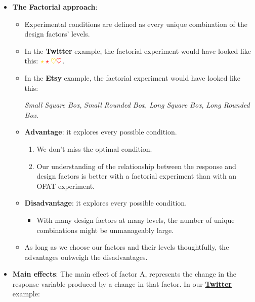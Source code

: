 \begin{itemize}
      \item \textbf{The Factorial approach}:
            \begin{itemize}
                  \item Experimental conditions are defined as every unique combination of the design factors' levels.
                  \item In the \textbf{Twitter} example, the factorial experiment would have looked like this:
                        $ \color{Gold}\star\color{Red}\star\color{Gold}\heartsuit\color{Red}\heartsuit $.
                  \item In the \textbf{Etsy} example, the factorial experiment would have looked like this:
                        \begin{tightcenter}
                              \emph{Small Square Box}, \emph{Small Rounded Box}, \emph{Long Square Box}, \emph{Long Rounded Box}.
                        \end{tightcenter}
                  \item \textbf{Advantage}: it explores every possible condition.
                        \begin{enumerate}[1.]
                              \item We don't miss the optimal condition.
                              \item Our understanding of the relationship between the response and design factors is better with a factorial experiment than with an OFAT experiment.
                        \end{enumerate}
                  \item \textbf{Disadvantage}: it explores every possible condition.
                        \begin{itemize}
                              \item With many design factors at many levels, the number of unique combinations might be unmanageably large.
                        \end{itemize}
                  \item As long as we choose our factors and their levels thoughtfully, the advantages outweigh the
                        disadvantages.
            \end{itemize}
      \item \textbf{Main effects}: The main effect of factor A, represents the change in the response variable produced
            by a change in that factor. In our \hyperref[ex:twit_ex]{\textbf{Twitter}} example:

\end{itemize}

